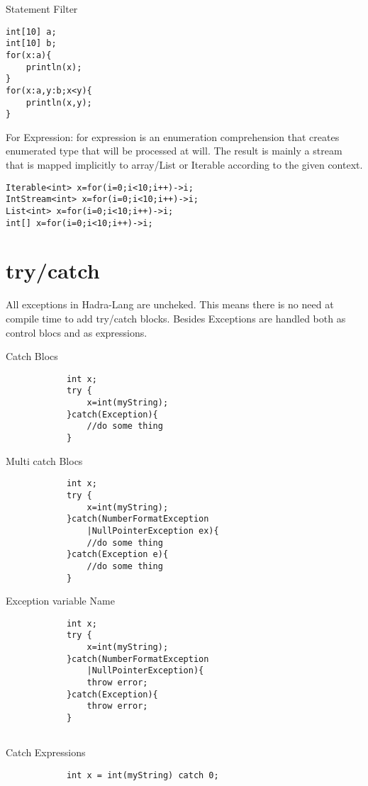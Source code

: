 \documentclass{tufte-book}
\begin{document}
            Statement Filter
            \begin{lstlisting}
int[10] a;
int[10] b;
for(x:a){
    println(x);
}
for(x:a,y:b;x<y){
    println(x,y);
}
            \end{lstlisting}
            For Expression:
            for expression is an enumeration comprehension that creates enumerated type that will be processed 
            at will. The result is mainly a stream that is mapped implicitly to array/List or Iterable according 
            to the given context.
            \begin{lstlisting}
Iterable<int> x=for(i=0;i<10;i++)->i;
IntStream<int> x=for(i=0;i<10;i++)->i;
List<int> x=for(i=0;i<10;i++)->i;
int[] x=for(i=0;i<10;i++)->i;
            \end{lstlisting}


            \section{try/catch}
            All exceptions in Hadra-Lang are uncheked. This means there is no need at compile time to add try/catch blocks. Besides Exceptions are handled both as control blocs and as expressions.

            Catch Blocs
            \begin{lstlisting}
            int x;
            try {
                x=int(myString);
            }catch(Exception){
                //do some thing
            }
            \end{lstlisting}


            Multi catch Blocs
            \begin{lstlisting}
            int x;
            try {
                x=int(myString);
            }catch(NumberFormatException
                |NullPointerException ex){
                //do some thing
            }catch(Exception e){
                //do some thing
            }
            \end{lstlisting}


            Exception variable Name
            \begin{lstlisting}
            int x;
            try {
                x=int(myString);
            }catch(NumberFormatException
                |NullPointerException){
                throw error;
            }catch(Exception){
                throw error;
            }
            
            \end{lstlisting}
            Catch Expressions
            \begin{lstlisting}
            int x = int(myString) catch 0;
            \end{lstlisting}
            
\end{document}
